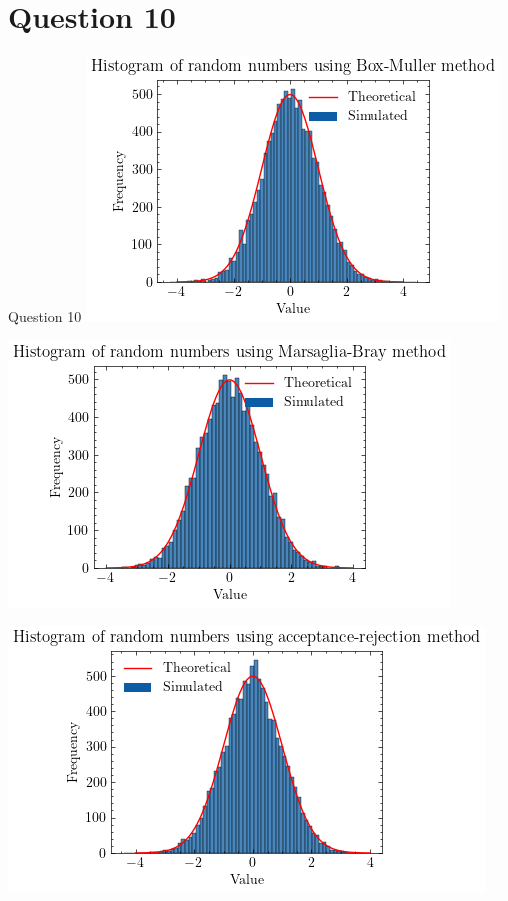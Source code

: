 \documentclass[compress,12pt]{beamer}
\begin{document}
\section{Question 10}
\begin{frame}{Question 10}
\centering
\includegraphics[scale=0.7]{imgs/boxmuller.png}  
\end{frame}
\begin{frame}
 \centering
 \includegraphics[scale=0.7]{imgs/marsagliabray.png}  \\
\end{frame}
\begin{frame}
 \centering
 \includegraphics[scale=0.7]{imgs/acceptancerejection.png}  \\
\end{frame}
\end{document}
